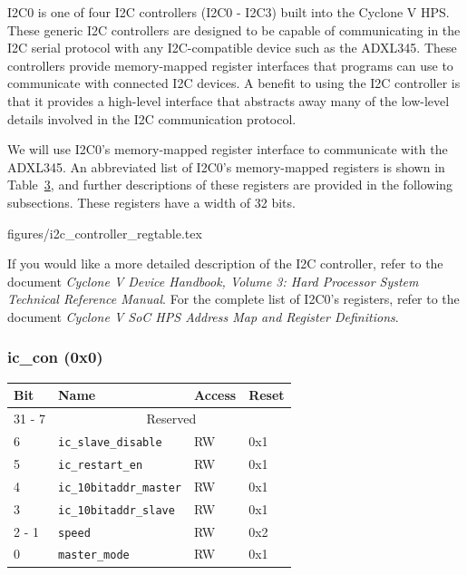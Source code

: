 \documentclass[11pt, twoside, pdftex]{article}
\begin{document}
I2C0 is one of four I2C controllers (I2C0 - I2C3) built into the Cyclone V HPS. These generic I2C controllers are designed to be capable of communicating in the I2C serial protocol with any I2C-compatible device such as the ADXL345. These controllers provide memory-mapped register interfaces that programs can use to communicate with connected I2C devices. A benefit to using the I2C controller is that it provides a high-level interface that abstracts away many of the low-level details involved in the I2C communication protocol. %

We will use I2C0's memory-mapped register interface to communicate with the ADXL345. An abbreviated list of I2C0's memory-mapped registers is shown in Table~\hyperref[tab:i2c_ctrl_regtable]{3}, and further descriptions of these registers are provided in the following subsections. These registers have a width of 32 bits. 

 {figures/i2c_controller_regtable.tex}

If you would like a more detailed description of the I2C controller, refer to the document \textit{Cyclone V Device Handbook, Volume 3: Hard Processor System Technical Reference Manual}. For the complete list of I2C0's registers, refer to the document \textit{Cyclone V SoC HPS Address Map and Register Definitions}.

\subsubsection{ic\_con (0x0)}

\begin{table}[H]
    \centering
    \begin{tabular}{|l|l|l|l|}
        \hline
            \textbf{Bit}
            & \textbf{Name}
            & \textbf{Access}
            & \textbf{Reset}
        \\\hline
            31 - 7
            & \multicolumn{3}{|c|}{Reserved}
        \\\hline
            6
            & \texttt{ic\_slave\_disable}
            & RW
            & 0x1
        \\\hline
            5
            & \texttt{ic\_restart\_en}
            & RW
            & 0x1
        \\\hline
            4
            & \texttt{ic\_10bitaddr\_master}
            & RW
            & 0x1
        \\\hline
            3
            & \texttt{ic\_10bitaddr\_slave}
            & RW
            & 0x1
        \\\hline
            2 - 1
            & \texttt{speed}
            & RW
            & 0x2
        \\\hline
            0
            & \texttt{master\_mode}
            & RW
            & 0x1
        \\\hline
    \end{tabular}
\end{table}
\end{document}

